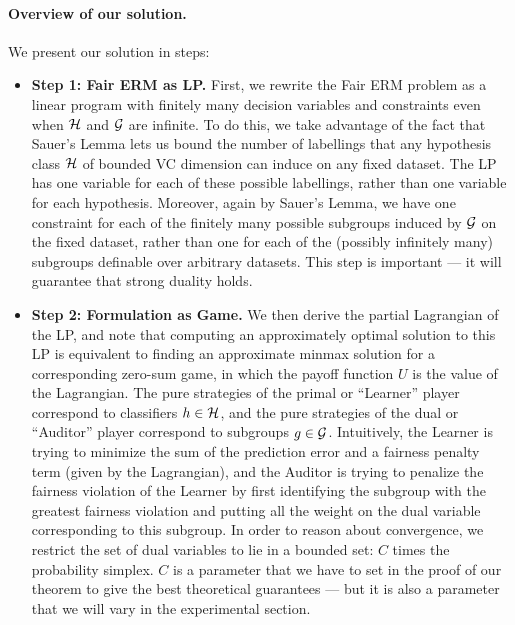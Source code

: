 \paragraph{Overview of our solution.} We present our solution in steps:
\begin{itemize}
\item
{\bf Step 1: Fair ERM as LP.}
First, we rewrite the Fair ERM problem as a linear program with
finitely many decision variables and constraints even when $\mathcal{H}$ and $\mathcal{G}$ are infinite. To do
this, we take advantage of the fact that Sauer's Lemma lets us bound
the number of labellings that any hypothesis class $\mathcal{H}$ of bounded
VC dimension can induce on any fixed dataset. The LP has one variable
for each of these possible labellings, rather than one
variable for each hypothesis. Moreover, again by Sauer's Lemma,
we have one constraint for each
of the finitely many possible subgroups induced by $\mathcal{G}$ on the fixed
dataset, rather than one for each of the (possibly infinitely many)
subgroups definable over arbitrary datasets. This step is important
--- it will guarantee that strong duality holds.

\item
{\bf Step 2: Formulation as Game.}
We then derive the partial Lagrangian of the LP, and note that
computing an approximately optimal solution to this LP is equivalent
to finding an approximate minmax solution for a corresponding zero-sum
game, in which the payoff function $U$ is the value of the
Lagrangian. The pure strategies of the primal or ``Learner'' player
correspond to classifiers $h \in \mathcal{H}$, and the pure strategies of the
dual or ``Auditor'' player correspond to subgroups $g \in \mathcal{G}$.
Intuitively, the Learner is trying to minimize the sum of the prediction
error and a fairness penalty term (given by the Lagrangian), and the
Auditor is trying to penalize the fairness violation of the Learner by
first identifying the subgroup with the greatest fairness violation and
putting all the weight on the dual variable corresponding to this
subgroup. %
In order to reason about convergence, we restrict the set of dual
variables to lie in a bounded set: $C$ times the probability
simplex. $C$ is a parameter that we have to set in the proof of our
theorem to give the best theoretical guarantees --- but it is also a
parameter that we will vary in the experimental section.

\end{itemize}
